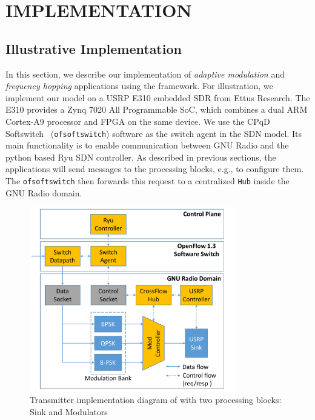 \chapter{\uppercase {\crossflowcap Implementation}}
\label{sec:evaluation}

\section{Illustrative \crossflow Implementation}

In this section, we describe our implementation of \emph{adaptive modulation} and \emph{frequency hopping} applications using the \crossflow framework. For illustration, we implement our model on a USRP E310 embedded SDR from Ettus Research. The E310 provides a Zynq 7020 All Programmable SoC, which combines a dual ARM Cortex-A9 processor and FPGA on the same device. We use the CPqD Softswitch~\cite{ofsoftswitch13} (\texttt{ofsoftswitch}) software as the switch agent in the SDN model. Its main functionality is to enable communication between GNU Radio and the python based Ryu SDN controller. As described in previous sections, the applications will send messages to the processing blocks, e.g., to configure them. The \texttt{ofsoftswitch} then forwards this request to a centralized \texttt{\crossflow Hub} inside the GNU Radio domain. 

\begin{figure}[t]
  \centering
  \includegraphics[width=0.8\textwidth]{figures/Flowgraph.pdf}
  \caption{Transmitter implementation diagram of \crossflow with two processing blocks: Sink and Modulators}
  \label{fig:flowgraph}
\end{figure}

